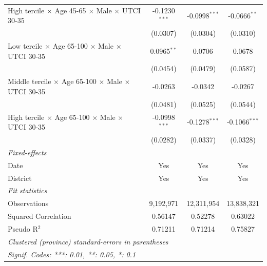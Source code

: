 \begin{table}[htbp]
\begin{tabular}{lccc}
      High tercile $\times$ Age 45-65 $\times$ Male $\times$ UTCI 30-35         & -0.1230$^{***}$ & -0.0998$^{***}$   & -0.0666$^{**}$\\   
                                                                                & (0.0307)        & (0.0304)          & (0.0310)\\   
      Low tercile $\times$ Age 65-100 $\times$ Male $\times$ UTCI 30-35         & 0.0965$^{**}$   & 0.0706            & 0.0678\\   
                                                                                & (0.0454)        & (0.0479)          & (0.0587)\\   
      Middle tercile $\times$ Age 65-100 $\times$ Male $\times$ UTCI 30-35      & -0.0263         & -0.0342           & -0.0267\\   
                                                                                & (0.0481)        & (0.0525)          & (0.0544)\\   
      High tercile $\times$ Age 65-100 $\times$ Male $\times$ UTCI 30-35        & -0.0998$^{***}$ & -0.1278$^{***}$   & -0.1066$^{***}$\\   
                                                                                & (0.0282)        & (0.0337)          & (0.0328)\\   
      \midrule
      \emph{Fixed-effects}\\
      Date                                                                      & Yes             & Yes               & Yes\\  
      District                                                                  & Yes             & Yes               & Yes\\  
      \midrule
      \emph{Fit statistics}\\
      Observations                                                              & 9,192,971       & 12,311,954        & 13,838,321\\  
      Squared Correlation                                                       & 0.56147         & 0.52278           & 0.63022\\  
      Pseudo R$^2$                                                              & 0.71211         & 0.71214           & 0.75827\\  
      \midrule \midrule
      \multicolumn{4}{l}{\emph{Clustered (province) standard-errors in parentheses}}\\
      \multicolumn{4}{l}{\emph{Signif. Codes: ***: 0.01, **: 0.05, *: 0.1}}\\
   \end{tabular}
\end{table}


